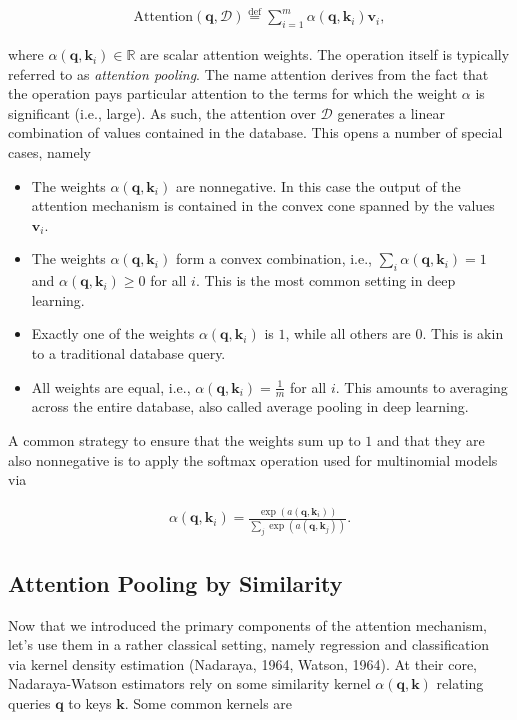 \documentclass[a4paper,12pt]{article}
\theoremstyle{definition}
\begin{document}
\begin{align*}
    \mathrm{Attention}(\mathbf{q}, \mathcal{D}) \stackrel{\mathrm{def}}{=} \sum_{i=1}^m \alpha(\mathbf{q}, \mathbf{k}_i) \mathbf{v}_i,
\end{align*}

where $\alpha(\mathbf{q}, \mathbf{k}_i) \in \mathbb{R}$ are scalar attention weights. The operation itself is typically referred to as \emph{attention pooling}.
The name attention derives from the fact that the operation pays particular attention to the terms for which the weight $\alpha$ is significant (i.e., large).
As such, the attention over $\mathcal{D}$ generates a linear combination of values contained in the database. This opens a number of special cases, namely
\begin{itemize}
    \item The weights $\alpha(\mathbf{q}, \mathbf{k}_i)$ are nonnegative. In this case the output of the attention mechanism is contained in the convex cone spanned by the values $\mathbf{v}_i$.
    \item The weights $\alpha(\mathbf{q}, \mathbf{k}_i)$ form a convex combination, i.e., $\sum_i \alpha(\mathbf{q}, \mathbf{k}_i) = 1$ and $\alpha(\mathbf{q}, \mathbf{k}_i) \geq 0$ for all $i$.
          This is the most common setting in deep learning.
    \item Exactly one of the weights $\alpha(\mathbf{q}, \mathbf{k}_i)$ is $1$, while all others are $0$. This is akin to a traditional database query.
    \item All weights are equal, i.e., $\alpha(\mathbf{q}, \mathbf{k}_i) = \frac{1}{m}$ for all $i$. This amounts to averaging across the entire database, also called average pooling in deep learning.
\end{itemize}
A common strategy to ensure that the weights sum up to $1$ and that they are also nonnegative is to apply the softmax operation used for multinomial models via

\begin{align*}
    \alpha(\mathbf{q}, \mathbf{k}_i) = \frac{\exp(a(\mathbf{q}, \mathbf{k}_i))}{\sum_j \exp(a(\mathbf{q}, \mathbf{k}_j))}.
\end{align*}


\subsection*{Attention Pooling by Similarity}
Now that we introduced the primary components of the attention mechanism, let’s use them in a rather classical setting, namely regression and classification via kernel density estimation (Nadaraya, 1964, Watson, 1964).
At their core, Nadaraya-Watson estimators rely on some similarity kernel $\alpha(\mathbf{q}, \mathbf{k})$ relating queries $\mathbf{q}$ to keys $\mathbf{k}$. Some common kernels are
\end{document}
